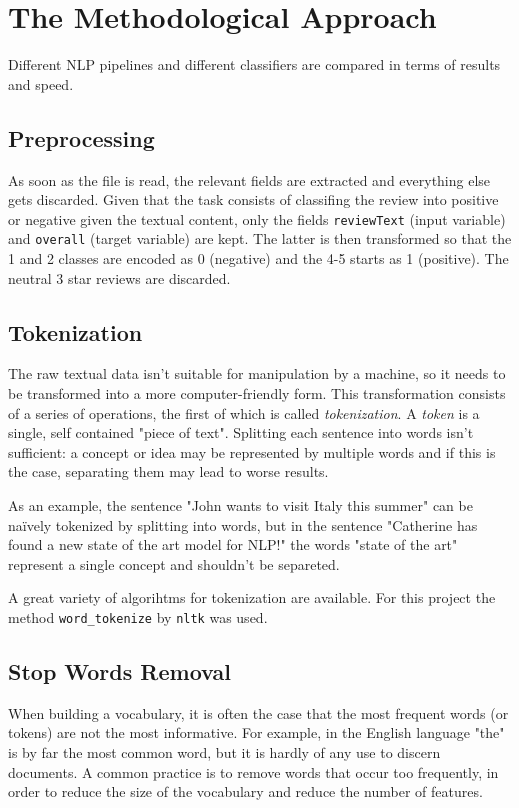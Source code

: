 \section{The Methodological Approach}
Different NLP pipelines and different classifiers are compared in terms of results and speed.

\subsection{Preprocessing}
As soon as the file is read, the relevant fields are extracted and everything else gets discarded. Given that the task consists of classifing the review into positive or negative given the textual content, only the fields \texttt{reviewText} (input variable) and \texttt{overall} (target variable) are kept. The latter is then transformed so that the 1 and 2 classes are encoded as 0 (negative) and the 4-5 starts as 1 (positive). The neutral 3 star reviews are discarded.

\subsection{Tokenization}
The raw textual data isn't suitable for manipulation by a machine, so it needs to be transformed into a more computer-friendly form. This transformation consists of a series of operations, the first of which is called \textit{tokenization}.
A \textit{token} is a single, self contained "piece of text". Splitting each sentence into words isn't sufficient: a concept or idea may be represented by multiple words and if this is the case, separating them may lead to worse results.


As an example, the sentence "John wants to visit Italy this summer" can be naïvely tokenized by splitting into words, but in the sentence "Catherine has found a new state of the art model for NLP!" the words "state of the art" represent a single concept and shouldn't be separeted.

A great variety of algorihtms for tokenization are available. For this project the method \texttt{word\_tokenize} by \texttt{nltk} was used.

\subsection{Stop Words Removal}
When building a vocabulary, it is often the case that the most frequent words (or tokens) are not the most informative. For example, in the English language "the" is by far the most common word, but it is hardly of any use to discern documents. A common practice is to remove words that occur too frequently, in order to reduce the size of the vocabulary and reduce the number of features.

